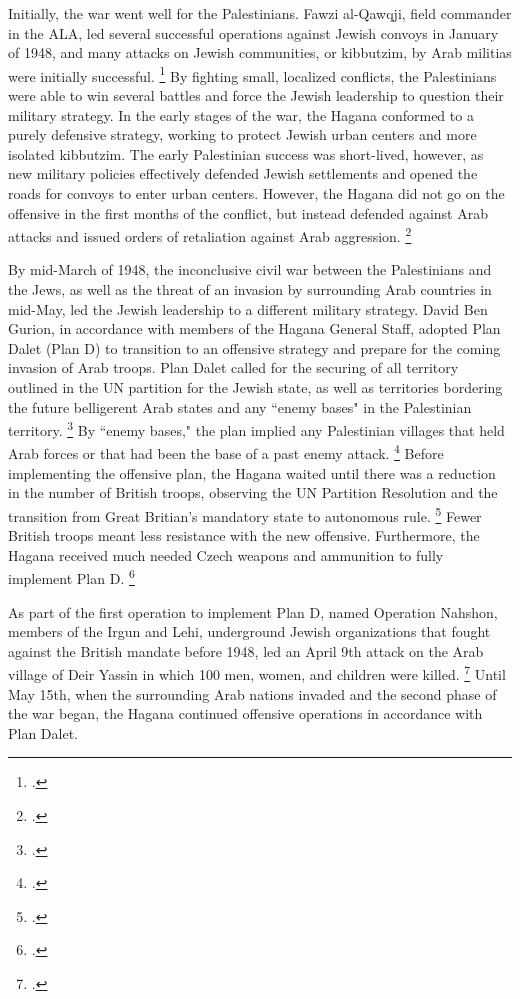 \documentclass[11pt]{turabian-researchpaper}
\begin{document}
Initially, the war went well for the Palestinians.  Fawzi al-Qawqji, field commander in the ALA, led several successful operations against Jewish convoys in January of 1948, and many attacks on Jewish communities, or kibbutzim, by Arab militias were initially successful.
\footcite[][79]{pappe}
By fighting small, localized conflicts, the Palestinians were able to win several battles and force the Jewish leadership to question their military strategy.  In the early stages of the war, the Hagana conformed to a purely defensive strategy, working to protect Jewish urban centers and more isolated kibbutzim.  The early Palestinian success was short-lived, however, as new military policies effectively defended Jewish settlements and opened the roads for convoys to enter urban centers.  However, the Hagana did not go on the offensive in the first months of the conflict, but instead defended against Arab attacks and issued orders of retaliation against Arab aggression.
\footcite[][68]{tal}



By mid-March of 1948, the inconclusive civil war between the Palestinians and the Jews, as well as the threat of an invasion by surrounding Arab countries in mid-May, led the Jewish leadership to a different military strategy.  David Ben Gurion, in accordance with members of the Hagana General Staff, adopted Plan Dalet (Plan D) to transition to an offensive strategy and prepare for the coming invasion of Arab troops.  Plan Dalet called for the securing of all territory outlined in the UN partition for the Jewish state, as well as territories bordering the future belligerent Arab states and any ``enemy bases" in the Palestinian territory.
\footcite{khalidi}
By ``enemy bases," the plan implied any Palestinian villages that held Arab forces or that had been the base of a past enemy attack.
\footcite[][119]{morris}
Before implementing the offensive plan, the Hagana waited until there was a reduction in the number of British troops, observing the UN Partition Resolution and the transition from Great Britian's mandatory state to autonomous rule.
\footcite[][32]{herzog}
Fewer British troops meant less resistance with the new offensive.  Furthermore, the Hagana received much needed Czech weapons and ammunition to fully implement Plan D.
\footcite[][116]{morris}



As part of the first operation to implement Plan D, named Operation Nahshon, members of the Irgun and Lehi, underground Jewish organizations that fought against the British mandate before 1948, led an April 9th attack on the Arab village of Deir Yassin in which 100 men, women, and children were killed.
\footcite{nabka}
Until May 15th, when the surrounding Arab nations invaded and the second phase of the war began, the Hagana continued offensive operations in accordance with Plan Dalet.
\end{document}
